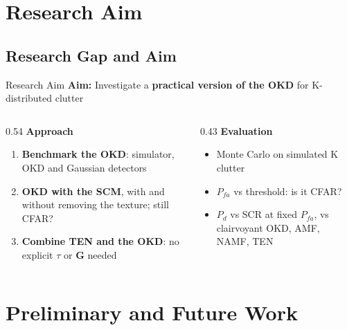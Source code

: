 \documentclass{beamer}
\begin{document}
\section{Research Aim}

\subsection{Research Gap and Aim}
\begin{frame}{Research Aim}
    \textbf{Aim:} Investigate a \textbf{practical version of the OKD} for K-distributed clutter 
    \vspace{1mm}
    \begin{columns}[T]
        \begin{column}{0.54\textwidth}
            \textbf{Approach}
            \begin{enumerate}
                \item \textbf{Benchmark the OKD}: simulator, OKD and Gaussian detectors
                \item \textbf{OKD with the SCM}, with and without removing the texture; still CFAR?
                \item \textbf{Combine TEN and the OKD}: no explicit $\tau$ or $\mathbf{G}$ needed
            \end{enumerate}
        \end{column}
        \begin{column}{0.43\textwidth}
            \textbf{Evaluation}
            \begin{itemize}
                \item Monte Carlo on simulated K clutter
                \item $P_{fa}$ vs threshold: is it CFAR?
                \item $P_d$ vs SCR at fixed $P_{fa}$, vs clairvoyant OKD, AMF, NAMF, TEN
            \end{itemize}
        \end{column}
    \end{columns}
    \vspace{1mm}
\end{frame}

\section{Preliminary and Future Work}
\end{document}
